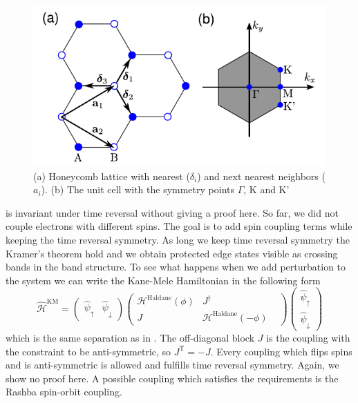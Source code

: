 \documentclass[a4paper,11pt]{report}
\begin{document}
\begin{figure}[H]
\begin{center}
\includegraphics[scale=0.50]{figures/honeycomb}
\caption{(a) Honeycomb lattice\cite{Hohenadler2013} with nearest ($\delta_i$) and next nearest neighbors ($a_i$). (b) The unit cell with the
symmetry points $\Gamma$, K and K'}
\label{f:honeycomb}
\end{center}
\end{figure}
 is invariant under time reversal without giving a proof here. So far, we did not couple electrons with different spins. The goal is to add
spin coupling terms while keeping the time reversal symmetry. As long we keep time reversal symmetry the Kramer's theorem hold and we obtain
protected edge states visible as crossing bands in the band structure. To see what happens when we add perturbation to the system we can write the
Kane-Mele Hamiltonian in the following form
\begin{equation}
  \hat{\mathcal{H}}^{\mathrm{KM}} = \left(\begin{matrix}\hat{\psi}_{\uparrow} & \hat{\psi}_{\downarrow}\end{matrix}\right)\left(\begin{matrix}
\mathcal{H}^{\mathrm{Haldane}}(\phi)  & J^\dagger\\
 J & \mathcal{H}^{\mathrm{Haldane}}(-\phi)& 
\end{matrix}\right)\left(\begin{matrix}\hat{\psi}_{\uparrow} \\ \hat{\psi}_{\downarrow}\end{matrix}\right)
\end{equation}
which is the same separation as in . The off-diagonal block $J$ is the coupling with the constraint to be anti-symmetric, so $J^{\mathrm{T}} = -J$. Every coupling which flips spins
and is anti-symmetric is allowed and fulfills time reversal symmetry. Again, we show no proof here. A possible coupling which satisfies the requirements
is the Rashba spin-orbit coupling.
\end{document}
